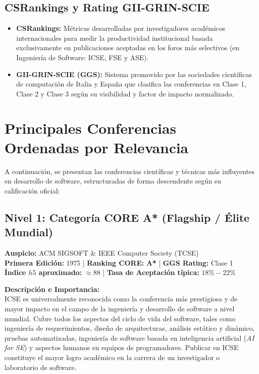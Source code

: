 \documentclass[12pt,a4paper]{article}
\begin{document}
\subsection{CSRankings y Rating GII-GRIN-SCIE}
\begin{itemize}[leftmargin=*]
    \item \textbf{CSRankings:} Métricas desarrolladas por investigadores académicos internacionales para medir la productividad institucional basada exclusivamente en publicaciones aceptadas en los foros más selectivos (en Ingeniería de Software: ICSE, FSE y ASE).
    \item \textbf{GII-GRIN-SCIE (GGS):} Sistema promovido por las sociedades científicas de computación de Italia y España que clasifica las conferencias en Clase 1, Clase 2 y Clase 3 según su visibilidad y factor de impacto normalizado.
\end{itemize}

\section{Principales Conferencias Ordenadas por Relevancia}

A continuación, se presentan las conferencias científicas y técnicas más influyentes en desarrollo de software, estructuradas de forma descendente según su calificación oficial:

\subsection{Nivel 1: Categoría CORE A* (Flagship / Élite Mundial)}

\begin{tcolorbox}[colback=white,colframe=tierAStar,title={\textbf{1. ICSE -- International Conference on Software Engineering}},fonttitle=\bfseries]
\textbf{Auspicio:} ACM SIGSOFT \& IEEE Computer Society (TCSE) \\
\textbf{Primera Edición:} 1975 \quad | \quad \textbf{Ranking CORE:} \textbf{A*} \quad | \quad \textbf{GGS Rating:} Clase 1 \\
\textbf{Índice $h5$ aproximado:} $\approx 88$ \quad | \quad \textbf{Tasa de Aceptación típica:} $18\% - 22\%$
\end{tcolorbox}
\textbf{Descripción e Importancia:} \\
ICSE es universalmente reconocida como la conferencia más prestigiosa y de mayor impacto en el campo de la ingeniería y desarrollo de software a nivel mundial. Cubre todos los aspectos del ciclo de vida del software, tales como ingeniería de requerimientos, diseño de arquitecturas, análisis estático y dinámico, pruebas automatizadas, ingeniería de software basada en inteligencia artificial (\textit{AI for SE}) y aspectos humanos en equipos de programadores. Publicar en ICSE constituye el mayor logro académico en la carrera de un investigador o laboratorio de software.
\end{document}

